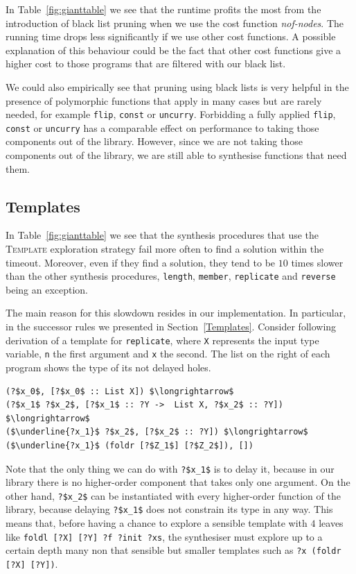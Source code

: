 In Table~\ref{fig:gianttable} we see that the runtime profits the most from the introduction of black list pruning when we use the cost function \textit{nof-nodes}.
The running time drops less significantly if we use other cost functions. A possible explanation of this behaviour could be the fact that other cost functions give a higher cost to those programs that are filtered with our black list.

We could also empirically see that pruning using black lists is very helpful in the presence of polymorphic functions that apply in many cases but are rarely needed, for example \lstinline?flip?, \lstinline?const? or \lstinline?uncurry?. Forbidding a fully applied \lstinline?flip?, \lstinline?const? or \lstinline?uncurry? has a comparable effect on performance to taking those components out of the library. However, since we are not taking those components out of the library, we are still able to synthesise functions that need them.

\subsection{Templates}\label{Eval. Templates}
In Table~\ref{fig:gianttable} we see that the synthesis procedures that use the \textsc{Template} exploration strategy fail more often to find a solution within the timeout. Moreover, even if they find a solution, they tend to be $10$ times slower than the other synthesis procedures, \lstinline?length?, \lstinline?member?, \lstinline?replicate? and \lstinline?reverse? being an exception.

The main reason for this slowdown resides in our implementation. In particular, in the successor rules we presented in Section~\ref{Templates}. 
Consider following derivation of a template for \lstinline?replicate?, where \lstinline?X? represents the input type variable, \lstinline?n? the first argument and \lstinline?x? the second. The list on the right of each program shows the type of its not delayed holes.
\begin{lstlisting}[style=plain]
(?$x_0$, [?$x_0$ :: List X]) $\longrightarrow$
(?$x_1$ ?$x_2$, [?$x_1$ :: ?Y ->  List X, ?$x_2$ :: ?Y]) $\longrightarrow$
($\underline{?x_1}$ ?$x_2$, [?$x_2$ :: ?Y]) $\longrightarrow$
($\underline{?x_1}$ (foldr [?$Z_1$] [?$Z_2$]), [])
\end{lstlisting}
Note that the only thing we can do with \lstinline!?$x_1$! is to delay it, because in our library there is no higher-order component that takes only one argument. On the other hand, \lstinline!?$x_2$! can be instantiated with every higher-order function of the library, because delaying \lstinline!?$x_1$! does not constrain its type in any way.
This means that, before having a chance to explore a sensible template with $4$ leaves like \lstinline!foldl [?X] [?Y] ?f ?init ?xs!, the synthesiser must explore up to a certain depth many non that sensible but smaller templates such as \lstinline!?x (foldr [?X] [?Y])!.

